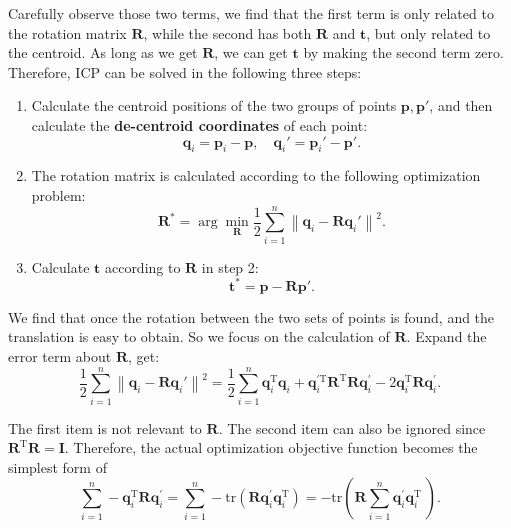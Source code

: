 Carefully observe those two terms, we find that the first term is only related to the rotation matrix $\mathbf{R}$, while the second has both $\mathbf{R}$ and $\mathbf{t}$, but only related to the centroid. As long as we get $\mathbf{R}$, we can get $\mathbf{t}$ by making the second term zero. Therefore, ICP can be solved in the following three steps:

\begin{mdframed}
\begin{enumerate}
	\item Calculate the centroid positions of the two groups of points $\mathbf{p}, \mathbf{p}'$, and then calculate the \textbf{de-centroid coordinates} of each point:
	\[
	\mathbf{q}_i = \mathbf{p}_i - \mathbf{p}, \quad \mathbf{q}_i' = \mathbf{p}_i' - \mathbf{p}'.
	\]
	\item The rotation matrix is calculated according to the following optimization problem:
	\begin{equation}
		\mathbf{R}^* = \arg \mathop {\min }\limits_{\mathbf{R}} \frac{1}{2}\sum\limits_{i = 1}^n {{\left\| {{\mathbf{q}_i} - \mathbf{R} \mathbf{q}_i' } \right\|}^2}.
	\end{equation}
	\item Calculate $\mathbf{t}$ according to $\mathbf{R}$ in step 2:
	\begin{equation}
	\label{eq:pnp-solve-t}
	\mathbf{t}^* = \mathbf{p} - \mathbf{R} \mathbf{p}'.
	\end{equation}
\end{enumerate}
\end{mdframed}

We find that once the rotation between the two sets of points is found, and the translation is easy to obtain. So we focus on the calculation of $\mathbf{R}$. Expand the error term about $\mathbf{R}$, get:
\begin{equation}
 \frac{1}{2}\sum\limits_{i = 1}^n \left\| {{\mathbf{q}_i} - \mathbf{R} \mathbf{q}_i' } \right\|^2 = \frac{1}{2}\sum\limits_{i = 1}^n \mathbf{q}_i^\mathrm{T} \mathbf{q}_i + \mathbf{q}_i^{ \prime \mathrm{T}}  \mathbf{R}^\mathrm{T} \mathbf{R} \mathbf{q}^\prime_i - 2\mathbf{q}_i^\mathrm{T} \mathbf{R} \mathbf{q}^\prime_i.
\end{equation}

The first item is not relevant to $\mathbf{R}$. The second item can also be ignored since $\mathbf{R}^\mathrm{T}\mathbf{R}=\mathbf{I}$. Therefore, the actual optimization objective function becomes the simplest form of
\begin{equation}
\sum\limits_{i = 1}^n - \mathbf{q}_i^\mathrm{T} \mathbf{R} \mathbf{q}^\prime_i = \sum\limits_{i = 1}^n -\mathrm{tr} \left( \mathbf{R} \mathbf{q}_i^{\prime} \mathbf{q}^{\mathrm{T}}_i \right) = - \mathrm{tr} \left( \mathbf{R} \sum\limits_{i = 1}^n \mathbf{q}_i^{\prime} \mathbf{q}^{\mathrm{T}}_i \ \right).
\end{equation}

